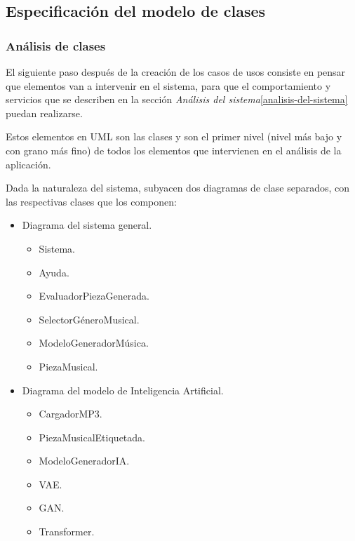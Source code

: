 
\subsection{Especificación del modelo de clases}
\label{especificacion-modelo-clases}
\subsubsection{Análisis de clases}

El siguiente paso después de la creación de los casos de usos consiste en pensar que elementos van a intervenir en el sistema, para que el comportamiento y servicios que se describen en la sección \emph{Análisis del sistema}\ref{analisis-del-sistema} puedan realizarse.

Estos elementos en UML son las clases y son el primer nivel (nivel más bajo y con grano más fino) de todos los elementos que intervienen en el análisis de la aplicación.

Dada la naturaleza del sistema, subyacen dos diagramas de clase separados, con las respectivas clases que los componen:
\begin{itemize}
    \item Diagrama del sistema general.
    \begin{itemize}
        \item Sistema.
        \item Ayuda.
        \item EvaluadorPiezaGenerada.
        \item SelectorGéneroMusical.
        \item ModeloGeneradorMúsica.
        \item PiezaMusical.
    \end{itemize}
    \item Diagrama del modelo de Inteligencia Artificial.
    \begin{itemize}
        \item CargadorMP3.
        \item PiezaMusicalEtiquetada.
        \item ModeloGeneradorIA.
        \item VAE.
        \item GAN.
        \item Transformer.
    \end{itemize}
\end{itemize}

